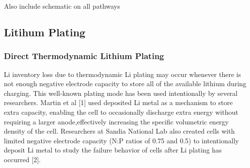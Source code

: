 \documentclass{article}
\begin{document}
Also include schematic on all pathways
\subsection{Litihum Plating}
\subsubsection{Direct Thermodynamic Lithium Plating}
Li inventory loss due to thermodynamic Li plating may occur whenever there is not enough negative electrode capacity to store all of the available lithium during charging.  This well-known plating mode has been used intentionally by several researchers.  Martin et al [1] used deposited Li metal as a mechanism to store extra capacity, enabling the cell to occasionally discharge extra energy without requiring a larger anode,effectively increasing the specific volumetric energy density of the cell.  Researchers at Sandia National Lab also created cells with limited negative electrode capacity (N:P ratios of 0.75 and 0.5) to intentionally deposit Li metal to study the failure behavior of cells after Li plating has occurred [2].
\end{document}
